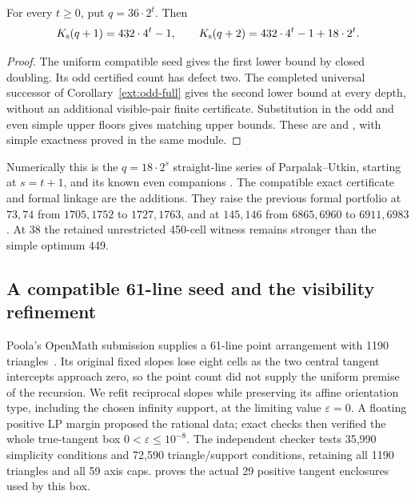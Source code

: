 \begin{theorem}\label{fam:37-complete}
For every $t\ge0$, put $q=36\cdot2^t$. Then
\begin{equation}
 K_{\mathrm{s}}(q+1)=432\cdot4^t-1,\qquad
 K_{\mathrm{s}}(q+2)=432\cdot4^t-1+18\cdot2^t.
 \label{fam:37-formula}
\end{equation}
\end{theorem}
\begin{proof}
The uniform compatible seed gives the first lower bound by closed
doubling. Its odd certified count has defect two. The completed
universal successor of Corollary~\ref{ext:odd-full} gives the second
lower bound at every depth, without an additional visible-pair finite
certificate. Substitution in the odd and even simple upper floors
gives matching upper bounds. These are
and ,
with simple exactness proved in the same module.
\end{proof}

Numerically this is the $q=18\cdot2^s$ straight-line series of
Parpalak--Utkin, starting at $s=t+1$, and its known even companions
\cite{parpalakutkin2026,parpalakutkinEven2026,blanc2011}.
The compatible exact certificate and formal linkage are the additions.
They raise the previous formal portfolio at $73,74$ from $1705,1752$
to $1727,1763$, and at $145,146$ from $6865,6960$ to $6911,6983$.
At 38 the retained unrestricted 450-cell witness remains stronger than
the simple optimum 449.

\subsection{A compatible 61-line seed and the visibility refinement}
\label{fam:seed61}

Poola's OpenMath submission supplies a 61-line point arrangement with
1190 triangles~\cite{poola2026}. Its original fixed slopes lose eight
cells as the two central tangent intercepts approach zero, so the point
count did not supply the uniform premise of the recursion. We refit
reciprocal slopes while preserving its affine orientation type, including
the chosen infinity support, at the limiting value $\varepsilon=0$.
A floating positive LP margin proposed the rational data; exact checks
then verified the whole true-tangent box $0<\varepsilon\le10^{-8}$.
The independent checker tests 35,990 simplicity conditions and 72,590
triangle/support conditions, retaining all 1190 triangles and all 59
axis caps.  proves the actual 29 positive
tangent enclosures used by this box.

